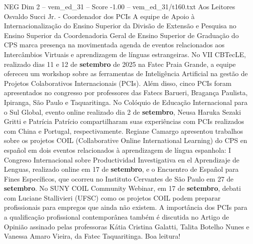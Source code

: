 \begin{textsample}{NEG Dim 2 – vem\_ed\_31 – Score -1.00 – vem\_ed\_31/t160.txt}  \label{ex:f2_neg_009}
Aos Leitores Osvaldo Succi Jr. - Coordenador dos PCIs A equipe de Apoio à Internacionalização do Ensino Superior da Divisão de Extensão e Pesquisa no Ensino Superior da Coordenadoria Geral de Ensino Superior de Graduação do CPS marca presença na movimentada agenda de eventos relacionados aos Intercâmbios Virtuais e aprendizagem de línguas estrangeiras.
No VII CBTecLE, realizado dias 11 e 12 de \textbf{setembro} de 2025 na Fatec Praia Grande, a equipe ofereceu um workshop sobre as ferramentas de Inteligência Artificial na gestão de Projetos Colaborativos Internacionais (PCIs).
Além disso, cinco PCIs foram apresentados no congresso por professores das Fatecs Barueri, Bragança Paulista, Ipiranga, São Paulo e Taquaritinga.
No Colóquio de Educação Internacional para o Sul Global, evento online realizado dia 2 de \textbf{setembro}, Neusa Haruka Sezaki Gritti e Patrícia Patrício compartilharam suas experiências com PCIs realizados com China e Portugal, respectivamente.
Regiane Camargo apresentou trabalhos sobre os projetos COIL (Collaborative Online International Learning) do CPS en español em dois eventos relacionados à aprendizagem de língua espanhola: I Congreso Internacional sobre Productividad Investigativa en el Aprendizaje de Lenguas, realizado online em 17 de \textbf{setembro}, e o Encuentro de Español para Fines Específicos, que ocorreu no Instituto Cervantes de São Paulo em 27 de \textbf{setembro}.
No SUNY COIL Community Webinar, em 17 de \textbf{setembro}, debati com Luciane Stallivieri (UFSC) como os projetos COIL podem preparar profissionais para empregos que ainda não existem.
A importância dos PCIs para a qualificação profissional contemporânea também é discutida no Artigo de Opinião assinado pelas professoras Kátia Cristina Galatti, Talita Botelho Nunes e Vanessa Amaro Vieira, da Fatec Taquaritinga.
Boa leitura!

\end{textsample}

